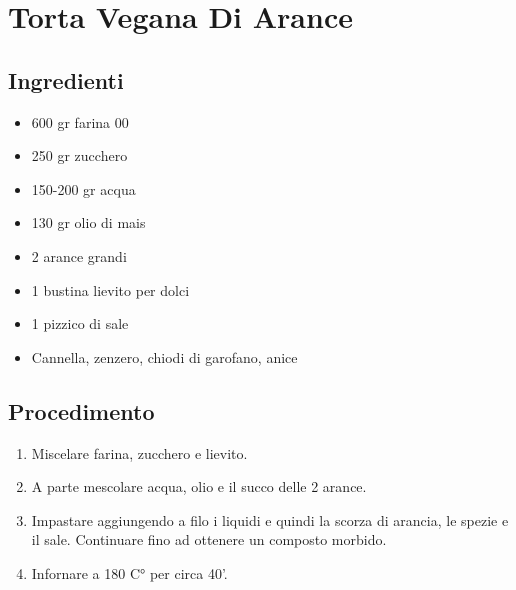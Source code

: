 \section{Torta Vegana Di Arance}
\subsection{Ingredienti}
\begin{itemize}
\item 600 gr farina 00  
\item 250 gr zucchero  
\item 150-200 gr acqua  
\item 130 gr olio di mais  
\item 2 arance grandi  
\item 1 bustina lievito per dolci  
\item 1 pizzico di sale  
\item Cannella, zenzero, chiodi di garofano, anice
\end{itemize}
\subsection{Procedimento}
\begin{enumerate}
\item  Miscelare farina, zucchero e lievito.   
\item  A parte mescolare acqua, olio e il succo delle 2 arance.  
\item  Impastare aggiungendo a filo i liquidi e quindi la scorza di arancia, le spezie e il sale. Continuare fino ad ottenere un composto morbido.  
\item  Infornare a 180 C° per circa 40'.
\end{enumerate}
